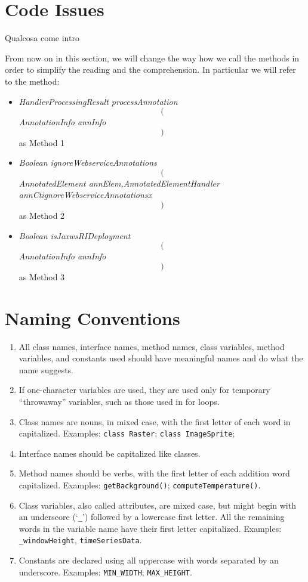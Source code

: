 \section{Code Issues}

Qualcosa come intro

From now on in this section, we will change the way how we call the methods in order to simplify the reading and the comprehension. \newline
In particular we will refer to the method:
\begin{itemize}
	\item \textit{HandlerProcessingResult processAnnotation $$($$AnnotationInfo annInfo$$)$$} as Method 1
	\item \textit{Boolean ignoreWebserviceAnnotations $$($$AnnotatedElement annElem,AnnotatedElementHandler annCtignoreWebserviceAnnotationsx$$)$$} as Method 2
	\item \textit{Boolean isJaxwsRIDeployment $$($$AnnotationInfo annInfo$$)$$} as Method 3
\end{itemize}

\section*{Naming Conventions}\begin{enumerate}[resume]
\item All class names, interface names, method names, class variables, method variables, and constants used should have meaningful names and do what the name suggests.
\item If one-character variables are used, they are used only for temporary ``throwaway'' variables, such as those used in for loops.
\item Class names are nouns, in mixed case, with the first letter of each word in capitalized. Examples: \texttt{class Raster}; \texttt{class ImageSprite};
\item Interface names should be capitalized like classes.
\item Method names should be verbs, with the first letter of each addition word capitalized. Examples: \texttt{getBackground()}; \texttt{computeTemperature()}.
\item Class variables, also called attributes, are mixed case, but might begin with an underscore (`\texttt{\_}') followed by a lowercase first letter. All the remaining words in the variable name have their first letter capitalized. Examples: \texttt{\_windowHeight}, \texttt{timeSeriesData}.
\item Constants are declared using all uppercase with words separated by an underscore. Examples: \texttt{MIN\_WIDTH}; \texttt{MAX\_HEIGHT}.
\end{enumerate}

